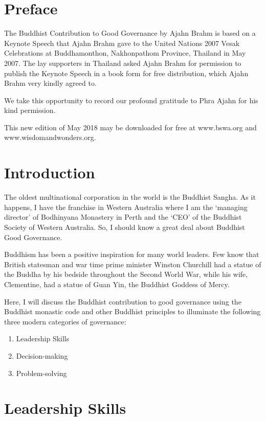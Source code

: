 \documentclass[11pt, openany]{book}
\begin{document}
\chapter*{Preface}

The Buddhist Contribution to Good Governance by Ajahn Brahm is based on a Keynote Speech that Ajahn Brahm gave to the United Nations 2007 Vesak Celebrations at Buddhamonthon, Nakhonpathom Province, Thailand in May 2007. The lay supporters in Thailand asked Ajahn Brahm for permission to publish the Keynote Speech in a book form for free distribution, which Ajahn Brahm very kindly agreed to.

We take this opportunity to record our profound gratitude to Phra Ajahn for his kind permission.

This new edition of May 2018 may be downloaded for free at www.bswa.org and www.wisdomandwonders.org.

\chapter*{Introduction}

The oldest multinational corporation in the world is the Buddhist Sangha. As it happens, I have the franchise in Western Australia where I am the ‘managing director’ of Bodhinyana Monastery in Perth and the ‘CEO’ of the Buddhist Society of Western Australia. So, I should know a great deal about Buddhist Good Governance.

Buddhism has been a positive inspiration for many world leaders. Few know that British statesman and war time prime minister Winston Churchill had a statue of the Buddha by his bedside throughout the Second World War, while his wife, Clementine, had a statue of Guan Yin, the Buddhist Goddess of Mercy.

Here, I will discuss the Buddhist contribution to good governance using the Buddhist monastic code and other Buddhist principles to illuminate the following three modern categories of governance:

\begin{enumerate} 
\item Leadership Skills
\item Decision-making
\item Problem-solving
\end{enumerate} 

\chapter{Leadership Skills}
\end{document}
